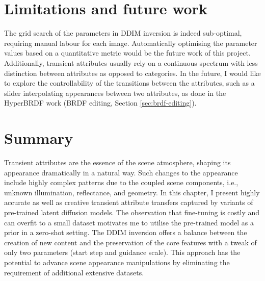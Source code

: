 









\section{Limitations and future work}
The grid search of the parameters in DDIM inversion is indeed sub-optimal, requiring manual labour for each image. Automatically optimising the parameter values based on a quantitative metric would be the future work of this project. Additionally, transient attributes usually rely on a continuous spectrum with less distinction between attributes as opposed to categories. In the future, I would like to explore the controllability of the transitions between the attributes, such as a slider interpolating appearances between two attributes, as done in the HyperBRDF work (BRDF editing, Section \ref{sec:brdf-editing}).

\section{Summary}

Transient attributes are the essence of the scene atmosphere, shaping its appearance dramatically in a natural way. Such changes to the appearance include highly complex patterns due to the coupled scene components, i.e., unknown illumination, reflectance, and geometry. In this chapter, I present highly accurate as well as creative transient attribute transfers captured by variants of pre-trained latent diffusion models. The observation that fine-tuning is costly and can overfit to a small dataset motivates me to utilise the pre-trained model as a prior in a zero-shot setting. The DDIM inversion offers a balance between the creation of new content and the preservation of the core features with a tweak of only two parameters (start step and guidance scale). This approach has the potential to advance scene appearance manipulations by eliminating the requirement of additional extensive datasets. 


